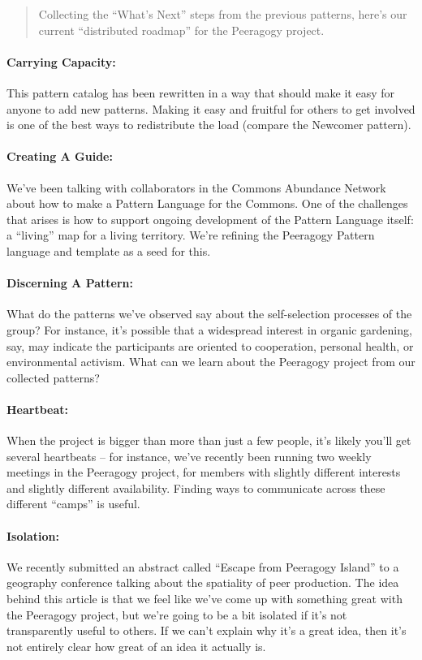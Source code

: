 \begin{quote}
Collecting the ``What's Next'' steps from the previous patterns, here's
our current ``distributed roadmap'' for the Peeragogy project.
\end{quote}

\paragraph{Carrying Capacity:} This pattern catalog has been rewritten in a way that should make it
easy for anyone to add new patterns. Making it easy and fruitful for
others to get involved is one of the best ways to redistribute the load
(compare the Newcomer pattern).

\paragraph{Creating A Guide:} We’ve been talking with collaborators in the Commons Abundance Network
about how to make a Pattern Language for the Commons. One of the
challenges that arises is how to support ongoing development of the
Pattern Language itself: a “living” map for a living territory. We’re
refining the Peeragogy Pattern language and template as a seed for this.

\paragraph{Discerning A Pattern:} What do the patterns we’ve observed say about the self-selection
processes of the group? For instance, it’s possible that a widespread
interest in organic gardening, say, may indicate the participants are
oriented to cooperation, personal health, or environmental activism.
What can we learn about the Peeragogy project from our collected
patterns?

\paragraph{Heartbeat:} When the project is bigger than more than just a few people, it’s likely
you’ll get several heartbeats – for instance, we’ve recently been
running two weekly meetings in the Peeragogy project, for members with
slightly different interests and slightly different availability.
Finding ways to communicate across these different “camps” is useful.

\paragraph{Isolation:} We recently submitted an abstract called “Escape from Peeragogy Island”
to a geography conference talking about the spatiality of peer
production. The idea behind this article is that we feel like we’ve come
up with something great with the Peeragogy project, but we’re going to
be a bit isolated if it’s not transparently useful to others. If we
can’t explain why it’s a great idea, then it’s not entirely clear how
great of an idea it actually is.

